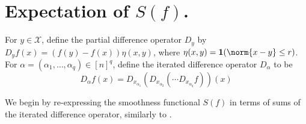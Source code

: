 \documentclass{article}
\newcommand{\1}{\mathbf{1}}
\newcommand{\domain}{\mathcal{X}}
\theoremstyle{alden}
\theoremstyle{aldenthm}
\theoremstyle{definition}
\theoremstyle{remark}
\begin{document}
\section{Expectation of $S(f)$.}

For $y \in \domain$, define the partial difference operator $D_y$ by $D_yf(x) = (f(y) - f(x))\eta(x,y)$, where $\eta(x,y) = \mathbf{1}(\norm{x - y} \leq r)$. For $\alpha = (\alpha_1,\ldots,\alpha_q) \in [n]^q$, define the iterated difference operator $D_{\alpha}$ to be
\begin{equation}
D_{\alpha}f(x) = D_{x_{\alpha_1}}(D_{x_{\alpha_2}}( \cdots D_{x_{\alpha_q}} f))(x)
\end{equation}

We begin by re-expressing the smoothness functional $S(f)$ in terms of sums of the iterated difference operator, similarly to \citep{sadhanala2017}.
\end{document}
